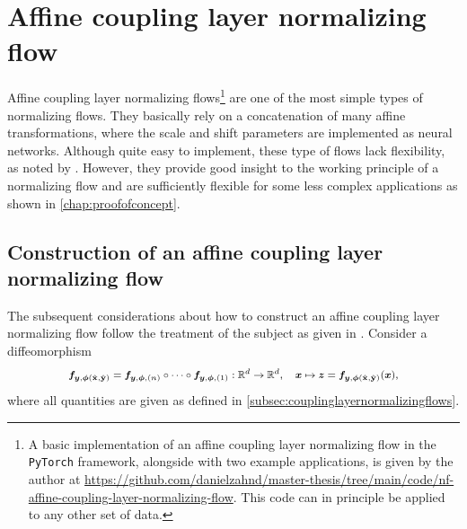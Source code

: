 \documentclass[a4paper,12pt]{report}
\begin{document}
\section{Affine coupling layer normalizing flow}\label{subsec:normflowsaffinecouplinglayers}
Affine coupling layer normalizing flows\cprotect\footnote{A basic implementation of an affine coupling layer normalizing flow in the \verb|PyTorch| framework, alongside with two example applications, is given by the author at \url{https://github.com/danielzahnd/master-thesis/tree/main/code/nf-affine-coupling-layer-normalizing-flow}. This code can in principle be applied to any other set of data.\label{footnote:NF_code}} are one of the most simple types of normalizing flows. They basically rely on a concatenation of many affine transformations, where the scale and shift parameters are implemented as neural networks. Although quite easy to implement, these type of flows lack flexibility, as noted by \cite[p.3]{Durkan.10.06.2019}. However, they provide good insight to the working principle of a normalizing flow and are sufficiently flexible for some less complex applications as shown in \cref{chap:proofofconcept}.
 
\subsection{Construction of an affine coupling layer normalizing flow}
The subsequent considerations about how to construct an affine coupling layer normalizing flow follow the treatment of the subject as given in \cite[p.3-5]{Dinh.27.05.2016}. Consider a diffeomorphism \begin{align}\footnotesize \begin{aligned}
\bm{f}_{\bm{y},\bm{\phi}(\hat{\boldsymbol{\mathbf{x}}},\hat{\boldsymbol{\mathbf{y}}})} = \bm{f}_{\bm{y},\bm{\phi},(n)}\circ \dots \circ \bm{f}_{\bm{y},\bm{\phi},(1)}: \mathbb{R}^d \rightarrow \mathbb{R}^d, \quad \bm{x} \mapsto \bm{z} = \bm{f}_{\bm{y},\bm{\phi}(\hat{\boldsymbol{\mathbf{x}}},\hat{\boldsymbol{\mathbf{y}}})}(\bm{x}),
\end{aligned}\end{align} where all quantities are given as defined in \cref{subsec:couplinglayernormalizingflows}. 
\end{document}
